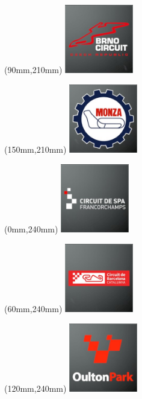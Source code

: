 \begin{textblock*}{30mm}(90mm,210mm)%
\includegraphics[width=30mm]{LG/2015-05-20_00075.png}
\end{textblock*}
\begin{textblock*}{30mm}(150mm,210mm)%
\includegraphics[width=30mm]{LG/2015-05-20_00086.png}
\end{textblock*}
\begin{textblock*}{30mm}(0mm,240mm)%
\includegraphics[width=30mm]{LG/2015-05-20_00079.png}
\end{textblock*}
\begin{textblock*}{30mm}(60mm,240mm)%
\includegraphics[width=30mm]{LG/2015-05-20_00078.png}
\end{textblock*}
\begin{textblock*}{30mm}(120mm,240mm)%
\includegraphics[width=30mm]{LG/2015-05-20_00091.png}
\end{textblock*}
